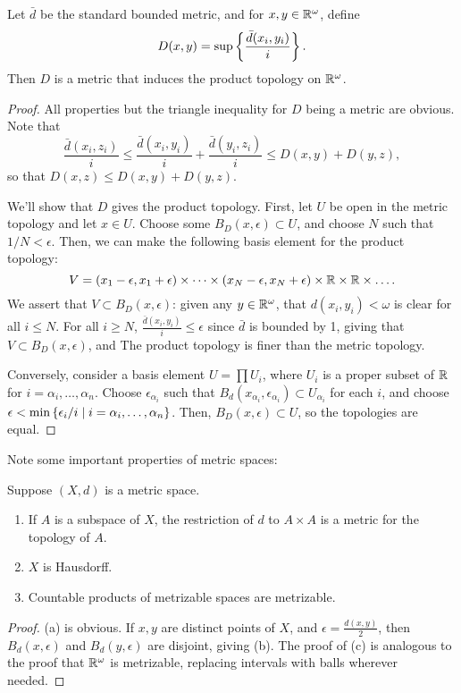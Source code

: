 \documentclass[10pt]{report}
\begin{document}
\begin{theorem}
  Let $\bar d$ be the standard bounded metric, and for $x,y \in \mathbb{R}^\omega$, define
  \[ D(x,y) = \sup \left\{ \frac{\bar d(x_i,y_i)}{i} \right\}.\]
  Then $D$ is a metric that induces the product topology on $\mathbb{R}^\omega$.
\end{theorem}
\begin{proof}
  All properties but the triangle inequality for $D$ being a metric are obvious.
  Note that 
  \[
    \frac{\bar d(x_i,z_i)}{i} 
    \leq \frac{\bar d(x_i,y_i)}{i} + \frac{\bar d(y_i,z_i)}{i}
    \leq D(x,y) + D(y,z),
  \]
  so that $D(x,z) \leq D(x,y) + D(y,z)$.

  We'll show that $D$ gives the product topology.
  First, let $U$ be open in the metric topology and let $x \in U$.
  Choose some $B_D(x,\epsilon) \subset U$, and choose $N$ such that $1/N < \epsilon$.
  Then, we can make the following basis element for the product topology:
  \[    
    V = \left( x_1 - \epsilon,x_1 + \epsilon \right) \times \dots \times \left( x_N - \epsilon,x_N + \epsilon \right) \times \mathbb{R} \times \mathbb{R} \times \dots .
  \]
  We assert that $V \subset B_D(x,\epsilon)$: given any $y \in \mathbb{R}^\omega$, 
  that $d(x_i,y_i) < \omega$ is clear for all $i \leq N$.
  For all $i \geq N$, $\frac{\bar d(x_i,y_i)}{i} \leq \epsilon$ since $\bar d$ is bounded by 1, giving that $V \subset B_D(x,\epsilon)$, and The product topology is finer than the metric topology.

  Conversely, consider a basis element $U = \prod U_i$, where $U_i$ is a proper subset of $\mathbb{R}$ for $i = \alpha_i,\dots,\alpha_n$.
  Choose $\epsilon_{\alpha_i}$ such that $B_d(x_{\alpha_i},\epsilon_{\alpha_i}) \subset U_{\alpha_i}$ for each $i$, and choose $\epsilon < \min \left\{ \epsilon_{i}/i \mid i = \alpha_i,\dots,\alpha_n \right\}$.
  Then, $B_D(x,\epsilon) \subset U$, so the topologies are equal.
\end{proof}

Note some important properties of metric spaces:
\begin{theorem}
  Suppose $(X,d)$ is a metric space.
  \begin{enumerate}[label={(\alph*)}]
    \item If $A$ is a subspace of $X$, the restriction of $d$ to $A \times A$ is a metric for the topology of $A$.
    \item $X$ is Hausdorff.
    \item Countable products of metrizable spaces are metrizable.
  \end{enumerate}
\end{theorem}
\begin{proof}
  (a) is obvious.
  If $x,y$ are distinct points of $X$, and $\epsilon = \frac{d(x,y)}{2}$, then $B_d(x,\epsilon)$ and $B_d(y,\epsilon)$ are disjoint, giving (b).
  The proof of (c) is analogous to the proof that $\mathbb{R}^\omega$ is metrizable, replacing intervals with balls wherever needed.
\end{proof}
\end{document}
